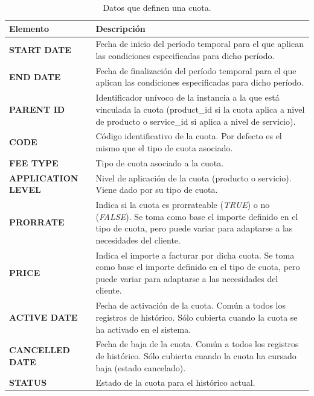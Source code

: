\begin{table}
  \centering
  \setlength{\leftmargini}{0.4cm}
  \resizebox{14cm}{!} {
  \begin{tabular}{|m{4cm} m{11cm}|}
  \rowcolor{udcpink!25}
  \hline
  	\textbf{Elemento} & \textbf{Descripción} \\\hline
  	\textbf{START DATE} & Fecha de inicio del período temporal para el que aplican las condiciones especificadas para dicho período.\\
  	\textbf{END DATE} & Fecha de finalización del período temporal para el que aplican las condiciones especificadas para dicho período.\\
	\textbf{PARENT ID} & Identificador unívoco de la instancia a la que está vinculada la cuota (product\_id si la cuota aplica a nivel de producto o service\_id si aplica a nivel de servicio).\\
	\textbf{CODE} & Código identificativo de la cuota. Por defecto es el mismo que el tipo de cuota asociado.\\	
	\textbf{FEE TYPE} & Tipo de cuota asociado a la cuota.\\
	\textbf{APPLICATION LEVEL} & Nivel de aplicación de la cuota (producto o servicio). Viene dado por su tipo de cuota.\\
	\textbf{PRORRATE} & Indica si la cuota es prorrateable (\textit{TRUE}) o no (\textit{FALSE}). Se toma como base el importe definido en el tipo de cuota, pero puede variar para adaptarse a las necesidades del cliente.\\
	\textbf{PRICE} & Indica el importe a facturar por dicha cuota. Se toma como base el importe definido en el tipo de cuota, pero puede variar para adaptarse a las necesidades del cliente.\\
	\textbf{ACTIVE DATE} & Fecha de activación de la cuota. Común a todos los registros de histórico. Sólo cubierta cuando la cuota se ha activado en el sistema.\\
	\textbf{CANCELLED DATE} & Fecha de baja de la cuota. Común a todos los registros de histórico. Sólo cubierta cuando la cuota ha cursado baja (estado cancelado).\\
	\textbf{STATUS} & Estado de la cuota para el histórico actual.	
	\\\hline
  \end{tabular}
  } %
  \caption{Datos que definen una cuota.}
  \label{tab:cuota}
\end{table}

